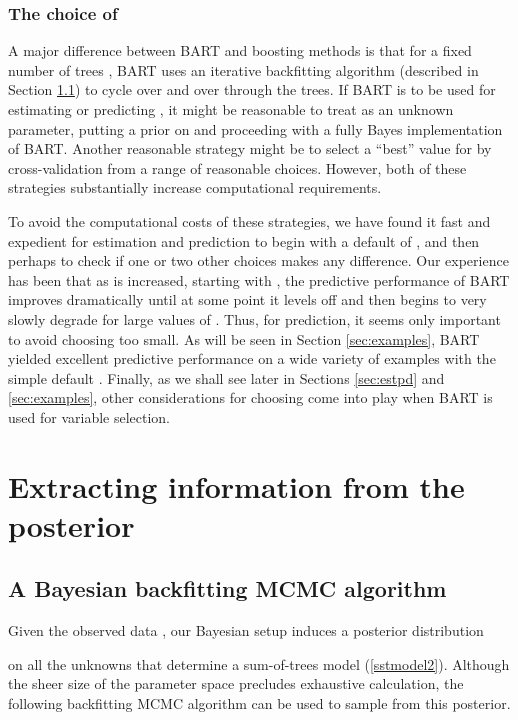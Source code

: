 \documentclass[aoas,nameyear,dvips]{arximspdf}
\begin{document}
\subsubsection{The choice of }\label{sec:numtrees}

A major difference between BART and  boosting methods is that for a
fixed number of trees ,  BART uses an iterative backfitting
algorithm (described in Section \ref{sec:mcmc}) to cycle over and over
through the  trees.  If BART is to be used for estimating  or
predicting , it might be reasonable to treat   as an unknown
parameter, putting a prior on  and proceeding with a fully Bayes
implementation of BART.  Another reasonable strategy might be to select
a ``best'' value for  by cross-validation from a range of reasonable
choices.  However, both of these strategies substantially increase
computational requirements.

To avoid the computational costs of these strategies, we have found it
fast and expedient for estimation and prediction to begin with a
default of , and then perhaps to check if one or two other
choices makes any difference.  Our experience has been that as  is
increased, starting with , the predictive performance of BART
improves dramatically until at some point it levels off  and then
begins to very slowly degrade for large values of .   Thus, for
prediction, it seems only important to avoid choosing  too small.
As will be seen in Section \ref{sec:examples},  BART yielded excellent
predictive performance on a wide variety of examples with the simple
default .  Finally, as we shall see later in Sections
\ref{sec:estpd} and \ref{sec:examples}, other considerations for
choosing  come into play when BART is used for variable selection.


\section{Extracting information from the posterior}\label{sec:postcalc}

\subsection{A Bayesian backfitting MCMC algorithm} \label{sec:mcmc}

Given the observed data , our Bayesian setup induces a
posterior distribution

on all the unknowns that determine a sum-of-trees model
(\ref{sstmodel2}).  Although the sheer size of the parameter
space precludes exhaustive calculation,  the following backfitting
MCMC algorithm can be used to sample from this posterior.
\end{document}
